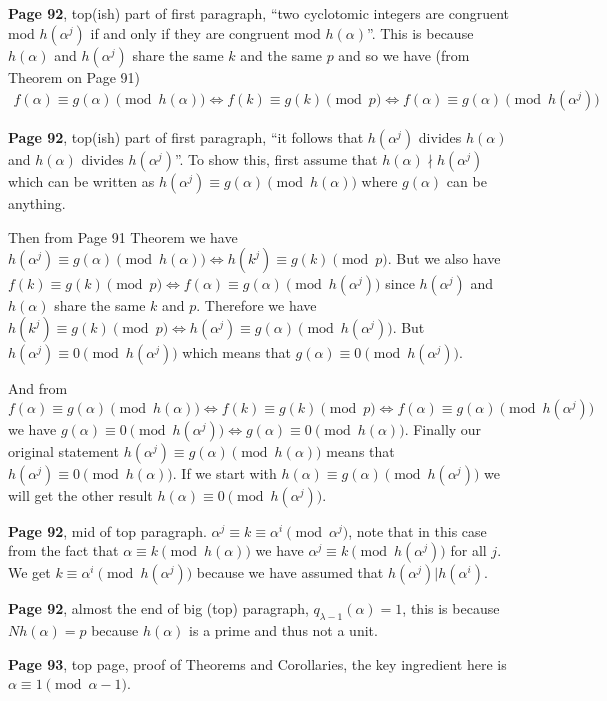 \documentclass[aps,preprint,preprintnumbers,nofootinbib,showpacs,prd]{revtex4-1}
\newcommand{\nbea}{\begin{eqnarray*}}
\newcommand{\neea}{\end{eqnarray*}}
\begin{document}
{\bf Page 92}, top(ish) part of first paragraph, ``two cyclotomic integers are congruent mod $h(\alpha^j)$ if and only if  they are congruent mod $h(\alpha)$''. This is because $h(\alpha)$ and $h(\alpha^j)$ share the same $k$ and the same $p$ and so we have (from Theorem on Page 91)
%
\nbea
f(\alpha) \equiv g(\alpha) \pmod{h(\alpha)} \Longleftrightarrow f(k) \equiv g(k) \pmod{p} \Longleftrightarrow f(\alpha) \equiv g(\alpha) \pmod{h(\alpha^j)}
\neea
%

{\bf Page 92}, top(ish) part of first paragraph, ``it follows that $h(\alpha^j)$ divides $h(\alpha)$ and $h(\alpha)$ divides $h(\alpha^j)$''. To show this, first assume that $h(\alpha)\nmid h(\alpha^j)$ which can be written as $h(\alpha^j) \equiv g(\alpha) \pmod{h(\alpha)}$ where $g(\alpha)$ can be anything.

Then from Page 91 Theorem we have $h(\alpha^j) \equiv g(\alpha) \pmod{h(\alpha)} \Longleftrightarrow h(k^j) \equiv g(k) \pmod{p}$. But we also have $f(k) \equiv g(k) \pmod{p} \Longleftrightarrow f(\alpha) \equiv g(\alpha) \pmod{h(\alpha^j)}$ since $h(\alpha^j)$ and $h(\alpha)$ share the same $k$ and $p$. Therefore we have $h(k^j) \equiv g(k) \pmod{p} \Longleftrightarrow h(\alpha^j) \equiv g(\alpha) \pmod{h(\alpha^j)}$. But $h(\alpha^j) \equiv 0 \pmod{h(\alpha^j)}$ which means that $g(\alpha) \equiv 0 \pmod{h(\alpha^j)}$.

And from $f(\alpha) \equiv g(\alpha) \pmod{h(\alpha)} \Longleftrightarrow f(k) \equiv g(k) \pmod{p} \Longleftrightarrow f(\alpha) \equiv g(\alpha) \pmod{h(\alpha^j)}$ we have $g(\alpha) \equiv 0 \pmod{h(\alpha^j)} \Longleftrightarrow g(\alpha) \equiv 0 \pmod{h(\alpha)}$. Finally our original statement $h(\alpha^j) \equiv g(\alpha) \pmod{h(\alpha)}$ means that $h(\alpha^j) \equiv 0 \pmod{h(\alpha)}$. If we start with $h(\alpha) \equiv g(\alpha) \pmod{h(\alpha^j)}$ we will get the other result $h(\alpha) \equiv 0 \pmod{h(\alpha^j)}$.

{\bf Page 92}, mid of top paragraph. $\alpha^j \equiv k \equiv \alpha^i \pmod{\alpha^j}$, note that in this case from the fact that $\alpha \equiv k \pmod{h(\alpha)}$ we have $\alpha^j \equiv k \pmod{h(\alpha^j)}$ for all $j$. We get $k \equiv \alpha^i \pmod{h(\alpha^j)}$ because we have assumed that $h(\alpha^j)|h(\alpha^i)$.

{\bf Page 92}, almost the end of big (top) paragraph, $q_{\lambda - 1}(\alpha) = 1$, this is because $Nh(\alpha) = p$ because $h(\alpha)$ is a prime and thus not a unit.

{\bf Page 93}, top page, proof of Theorems and Corollaries, the key ingredient here is $\alpha \equiv 1 \pmod{\alpha - 1}$.
\end{document}
